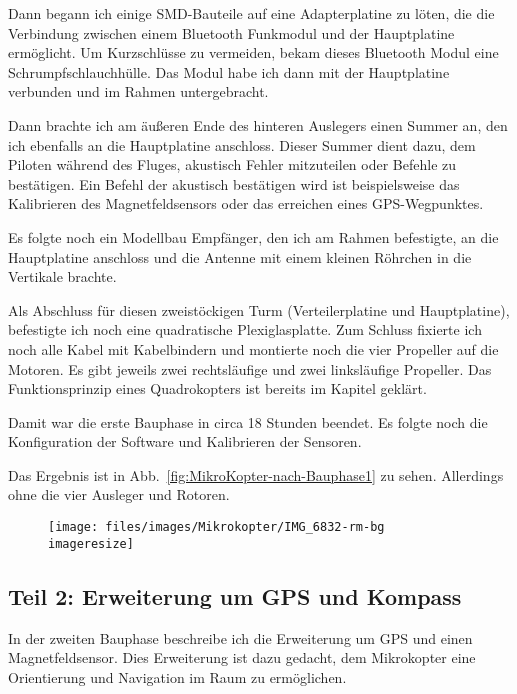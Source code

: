 Dann begann ich einige \acs{SMD}-Bauteile auf eine Adapterplatine zu löten,
die die Verbindung zwischen einem Bluetooth Funkmodul und der Hauptplatine ermöglicht.
Um Kurzschlüsse zu vermeiden, bekam dieses Bluetooth Modul eine Schrumpfschlauchhülle.
Das Modul habe ich dann mit der Hauptplatine verbunden und im Rahmen untergebracht.

Dann brachte ich am äußeren Ende des hinteren Auslegers einen Summer an,
den ich ebenfalls an die Hauptplatine anschloss.
Dieser Summer dient dazu, dem Piloten während des Fluges,
akustisch Fehler mitzuteilen oder Befehle zu bestätigen.
Ein Befehl der akustisch bestätigen wird ist
beispielsweise das Kalibrieren des Magnetfeldsensors
oder das erreichen eines \ac{GPS}-Wegpunktes.

Es folgte noch ein Modellbau Empfänger,
den ich am Rahmen befestigte, an die Hauptplatine anschloss und
die Antenne mit einem kleinen Röhrchen in die Vertikale brachte.

Als Abschluss für diesen zweistöckigen Turm (Verteilerplatine und Hauptplatine),
befestigte ich noch eine quadratische Plexiglasplatte.
Zum Schluss fixierte ich noch alle Kabel mit Kabelbindern
und montierte noch die vier Propeller auf die Motoren.
Es gibt jeweils zwei rechtsläufige und zwei linksläufige Propeller.
Das Funktionsprinzip eines Quadrokopters ist bereits im Kapitel
 geklärt.

Damit war die erste Bauphase in circa 18 Stunden beendet.
Es folgte noch die Konfiguration der Software
und Kalibrieren der Sensoren.

Das Ergebnis ist in Abb.~\vref{fig:MikroKopter-nach-Bauphase1} zu sehen.
Allerdings ohne die vier Ausleger und Rotoren.

\begin{figure}\centering
	\texttt{[image: files/images/Mikrokopter/IMG\_6832-rm-bg\\imageresize]}
	\label{fig:MikroKopter-nach-Bauphase1}
\end{figure}

\subsection{Teil 2: Erweiterung um \acs{GPS} und Kompass}
\label{subsec:bau:Mikrokopter:teil2}

In der zweiten Bauphase beschreibe ich die Erweiterung um \ac{GPS}
und einen Magnetfeldsensor.
Dies Erweiterung ist dazu gedacht,
dem Mikrokopter eine Orientierung und Navigation im Raum zu ermöglichen.

